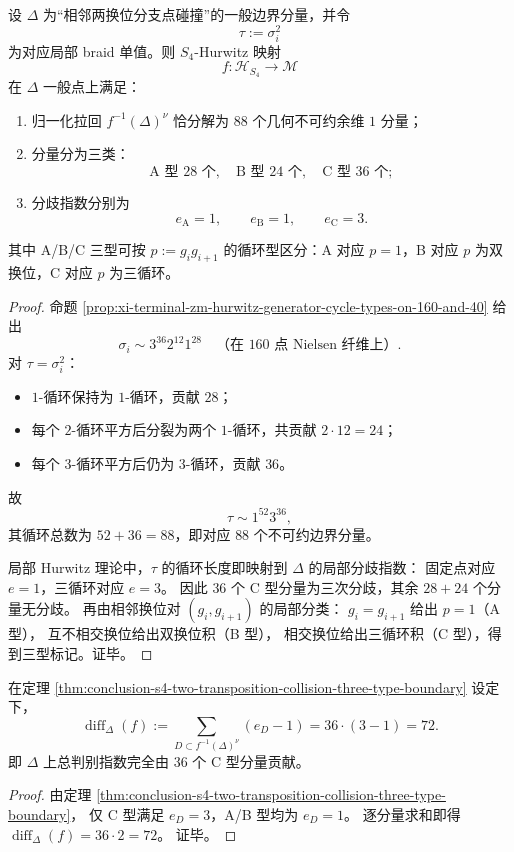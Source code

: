 \begin{theorem}[两换位碰撞边界的三分型分解与分歧阶]\label{thm:conclusion-s4-two-transposition-collision-three-type-boundary}
设 \(\Delta\) 为“相邻两换位分支点碰撞”的一般边界分量，并令
\[
\tau:=\sigma_i^2
\]
为对应局部 braid 单值。则 \(S_4\)-Hurwitz 映射
\[
f:\mathcal H_{S_4}\to \mathcal M
\]
在 \(\Delta\) 一般点上满足：
\begin{enumerate}
  \item 归一化拉回 \(f^{-1}(\Delta)^\nu\) 恰分解为 \(88\) 个几何不可约余维 \(1\) 分量；
  \item 分量分为三类：
  \[
  \text{A 型 }28\text{ 个},\quad
  \text{B 型 }24\text{ 个},\quad
  \text{C 型 }36\text{ 个};
  \]
  \item 分歧指数分别为
  \[
  e_{\mathrm A}=1,\qquad e_{\mathrm B}=1,\qquad e_{\mathrm C}=3.
  \]
\end{enumerate}
其中 A/B/C 三型可按 \(p:=g_ig_{i+1}\) 的循环型区分：A 对应 \(p=1\)，B 对应 \(p\) 为双换位，C 对应 \(p\) 为三循环。
\end{theorem}
\begin{proof}
命题 \ref{prop:xi-terminal-zm-hurwitz-generator-cycle-types-on-160-and-40} 给出
\[
\sigma_i\sim 3^{36}2^{12}1^{28}\quad\text{（在 \(160\) 点 Nielsen 纤维上）}.
\]
对 \(\tau=\sigma_i^2\)：
\begin{itemize}
  \item \(1\)-循环保持为 \(1\)-循环，贡献 \(28\)；
  \item 每个 \(2\)-循环平方后分裂为两个 \(1\)-循环，共贡献 \(2\cdot 12=24\)；
  \item 每个 \(3\)-循环平方后仍为 \(3\)-循环，贡献 \(36\)。
\end{itemize}
故
\[
\tau\sim 1^{52}3^{36},
\]
其循环总数为 \(52+36=88\)，即对应 \(88\) 个不可约边界分量。

局部 Hurwitz 理论中，\(\tau\) 的循环长度即映射到 \(\Delta\) 的局部分歧指数：
固定点对应 \(e=1\)，三循环对应 \(e=3\)。
因此 \(36\) 个 C 型分量为三次分歧，其余 \(28+24\) 个分量无分歧。
再由相邻换位对 \((g_i,g_{i+1})\) 的局部分类：
\(g_i=g_{i+1}\) 给出 \(p=1\)（A 型），
互不相交换位给出双换位积（B 型），
相交换位给出三循环积（C 型），得到三型标记。证毕。
\end{proof}

\begin{corollary}\label{cor:conclusion-s4-boundary-different-exponent-72}
在定理 \ref{thm:conclusion-s4-two-transposition-collision-three-type-boundary} 设定下，
\[
\operatorname{diff}_{\Delta}(f)
:=\sum_{D\subset f^{-1}(\Delta)^\nu}(e_D-1)
=36\cdot(3-1)=72.
\]
即 \(\Delta\) 上总判别指数完全由 \(36\) 个 C 型分量贡献。
\end{corollary}
\begin{proof}
由定理 \ref{thm:conclusion-s4-two-transposition-collision-three-type-boundary}，
仅 C 型满足 \(e_D=3\)，A/B 型均为 \(e_D=1\)。
逐分量求和即得
\(
\operatorname{diff}_\Delta(f)=36\cdot 2=72
\)。
证毕。
\end{proof}

